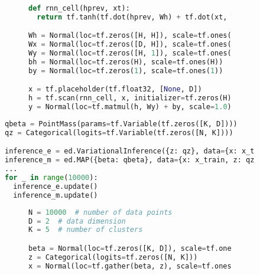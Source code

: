 \documentclass{article} %
\begin{document}
\begin{figure}[t]
\begin{subfigure}{0.35\columnwidth}
  \centering
  
\end{subfigure}%
\begin{subfigure}{0.6\columnwidth}
\begin{lstlisting}[language=python]
def rnn_cell(hprev, xt):
  return tf.tanh(tf.dot(hprev, Wh) + tf.dot(xt, Wx) + bh)

Wh = Normal(loc=tf.zeros([H, H]), scale=tf.ones([H, H]))
Wx = Normal(loc=tf.zeros([D, H]), scale=tf.ones([D, H]))
Wy = Normal(loc=tf.zeros([H, 1]), scale=tf.ones([H, 1]))
bh = Normal(loc=tf.zeros(H), scale=tf.ones(H))
by = Normal(loc=tf.zeros(1), scale=tf.ones(1))

x = tf.placeholder(tf.float32, [None, D])
h = tf.scan(rnn_cell, x, initializer=tf.zeros(H))
y = Normal(loc=tf.matmul(h, Wy) + by, scale=1.0)
\end{lstlisting}
\end{subfigure}
\caption{}
\end{figure}

\begin{figure}[t]
\centering
\begin{lstlisting}[language=Python]
qbeta = PointMass(params=tf.Variable(tf.zeros([K, D])))
qz = Categorical(logits=tf.Variable(tf.zeros([N, K])))

inference_e = ed.VariationalInference({z: qz}, data={x: x_train, beta: qbeta})
inference_m = ed.MAP({beta: qbeta}, data={x: x_train, z: qz})
...
for _ in range(10000):
  inference_e.update()
  inference_m.update()
\end{lstlisting}
\caption{}
\end{figure}

\begin{figure}[t]
\begin{subfigure}{0.35\columnwidth}
  \centering
  
\end{subfigure}%
\begin{subfigure}{0.6\columnwidth}
  \centering
\begin{lstlisting}[language=python]
N = 10000  # number of data points
D = 2  # data dimension
K = 5  # number of clusters

beta = Normal(loc=tf.zeros([K, D]), scale=tf.ones([K, D]))
z = Categorical(logits=tf.zeros([N, K]))
x = Normal(loc=tf.gather(beta, z), scale=tf.ones([N, D]))
\end{lstlisting}
\end{subfigure}
\caption{}
\end{figure}
\end{document}
